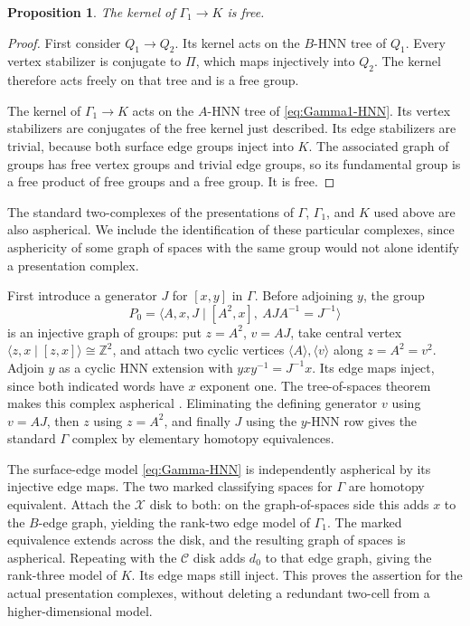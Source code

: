 \documentclass[11pt]{amsart}
\newtheorem{proposition}[theorem]{Proposition}
\theoremstyle{definition}
\theoremstyle{remark}
\newcommand{\Z}{\mathbb Z}
\begin{document}
\begin{proposition}\label{prop:free-kernel}
The kernel of $\Gamma_1\to K$ is free.
\end{proposition}
\begin{proof}
First consider $Q_1\to Q_2$. Its kernel acts on the $B$-HNN
tree of $Q_1$. Every vertex stabilizer is conjugate to $\Pi$,
which maps injectively into $Q_2$. The kernel therefore acts freely
on that tree and is a free group.

The kernel of $\Gamma_1\to K$ acts on the $A$-HNN tree of
\eqref{eq:Gamma1-HNN}. Its vertex stabilizers are conjugates of
the free kernel just described. Its edge stabilizers are trivial,
because both surface edge groups inject into $K$. The associated
graph of groups has free vertex groups and trivial edge groups,
so its fundamental group is a free product of free groups and a
free group. It is free.
\end{proof}

The standard two-complexes of the presentations of $\Gamma$,
$\Gamma_1$, and $K$ used above are also aspherical. We include the
identification of these particular complexes, since asphericity of
some graph of spaces with the same group would not alone identify a
presentation complex.

First introduce a generator $J$ for $[x,y]$ in $\Gamma$. Before
adjoining $y$, the group
\[
 P_0=\langle A,x,J\mid[A^2,x],\ AJA^{-1}=J^{-1}\rangle
\]
is an injective graph of groups: put $z=A^2$, $v=AJ$, take central
vertex $\langle z,x\mid[z,x]\rangle\cong\Z^2$, and attach two
cyclic vertices $\langle A\rangle,\langle v\rangle$ along
$z=A^2=v^2$. Adjoin $y$ as a cyclic HNN extension with
$yxy^{-1}=J^{-1}x$. Its edge maps inject, since both indicated
words have $x$ exponent one. The tree-of-spaces theorem makes this
complex aspherical \cite[Theorem 1B.11]{Hat02}. Eliminating the
defining generator $v$ using $v=AJ$, then $z$ using $z=A^2$,
and finally $J$ using the $y$-HNN row gives the standard $\Gamma$
complex by elementary homotopy equivalences.

The surface-edge model \eqref{eq:Gamma-HNN} is independently
aspherical by its injective edge maps. The two marked classifying
spaces for $\Gamma$ are homotopy equivalent. Attach the
$\mathcal X$ disk to both: on the graph-of-spaces side this adds
$x$ to the $B$-edge graph, yielding the rank-two edge model of
$\Gamma_1$. The marked equivalence extends across the disk, and
the resulting graph of spaces is aspherical. Repeating with the
$\mathcal C$ disk adds $d_0$ to that edge graph, giving the
rank-three model of $K$. Its edge maps still inject. This proves
the assertion for the actual presentation complexes, without deleting
a redundant two-cell from a higher-dimensional model.
\end{document}
